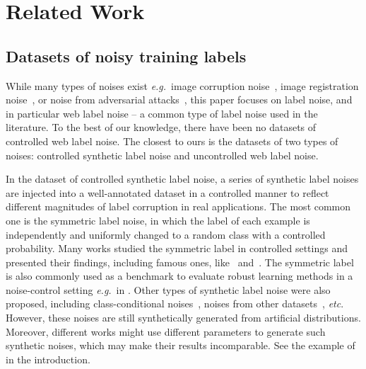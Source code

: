 \documentclass{article}
\newcommand{\eg}{\emph{e.g.}} \newcommand{\Eg}{\emph{E.g}}
\newcommand{\etc}{\emph{etc}}
\begin{document}
\section{Related Work}

\subsection{Datasets of noisy training labels}
While many types of noises exist \eg~image corruption noise~\citep{hendrycks2019benchmarking}, image registration noise~\citep{mnih2012learning}, or noise from adversarial attacks~\citep{zhang2019theoretically}, this paper focuses on label noise, and in particular web label noise -- a common type of label noise used in the literature. To the best of our knowledge, there have been no datasets of controlled web label noise. The closest to ours is the datasets of two types of noises: controlled synthetic label noise and uncontrolled web label noise.

In the dataset of controlled synthetic label noise, a series of synthetic label noises are injected into a well-annotated dataset in a controlled manner to reflect different magnitudes of label corruption in real applications. The most common one is the symmetric label noise, in which the label of each example is independently and uniformly changed to a random class with a controlled probability. Many works studied the symmetric label in controlled settings and presented their findings, including famous ones, like~\citep{zhang2017understanding} and~\citep{arpit2017closer}. The symmetric label is also commonly used as a benchmark to evaluate robust learning methods in a noise-control setting \eg~in \citep{vahdat2017toward,shu2019meta,jiang2018mentornet,ma2018dimensionality,han2018co,van2015learning,li2019learning,arazo2019unsupervised,charoenphakdee2019symmetric}. Other types of synthetic label noise were also proposed, including class-conditional noises~\citep{patrini2017making,rolnick2017deep,reeve2019fast,han2018masking}, noises from other datasets~\citep{wang2018iterative,seo2019combinatorial}, \etc. However, these noises are still synthetically generated from artificial distributions. Moreover, different works might use different parameters to generate such synthetic noises, which may make their results incomparable. See the example of~\citep{rolnick2017deep} in the introduction. 
\end{document}
